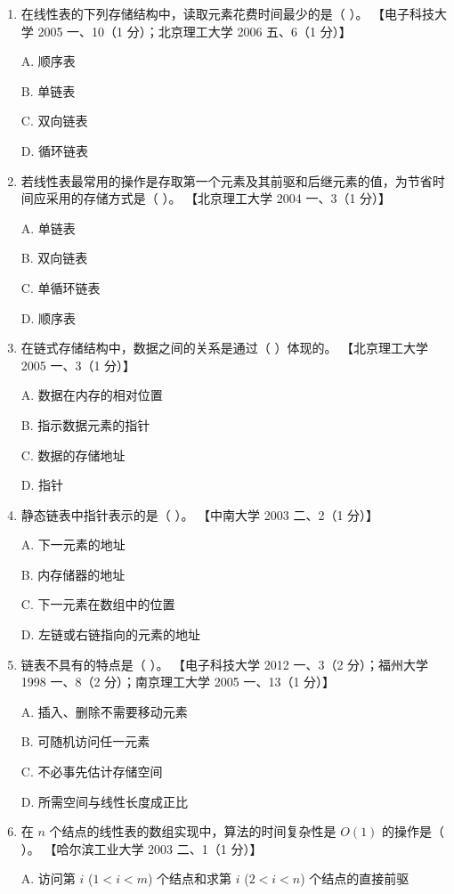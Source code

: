 \documentclass[lang=cn,newtx,10pt,scheme=chinese]{elegantbook}
\begin{document}
\begin{enumerate}
    \item 在线性表的下列存储结构中，读取元素花费时间最少的是（ ）。  
    【电子科技大学 2005 一、10（1 分）；北京理工大学 2006 五、6（1 分）】  

    A. 顺序表  

    B. 单链表  

    C. 双向链表  

    D. 循环链表  

    \item 若线性表最常用的操作是存取第一个元素及其前驱和后继元素的值，为节省时间应采用的存储方式是（ ）。  
    【北京理工大学 2004 一、3（1 分）】  

    A. 单链表  

    B. 双向链表  

    C. 单循环链表  

    D. 顺序表  

    \item 在链式存储结构中，数据之间的关系是通过（ ）体现的。  
    【北京理工大学 2005 一、3（1 分）】  

    A. 数据在内存的相对位置  

    B. 指示数据元素的指针  

    C. 数据的存储地址  

    D. 指针  

    \item 静态链表中指针表示的是（ ）。  
    【中南大学 2003 二、2（1 分）】  

    A. 下一元素的地址  

    B. 内存储器的地址 

    C. 下一元素在数组中的位置  

    D. 左链或右链指向的元素的地址  

    \item 链表不具有的特点是（ ）。  
    【电子科技大学 2012 一、3（2 分）；福州大学 1998 一、8（2 分）；南京理工大学 2005 一、13（1 分）】 

    A. 插入、删除不需要移动元素

    B. 可随机访问任一元素  

    C. 不必事先估计存储空间  

    D. 所需空间与线性长度成正比  

    \item 在 $n$ 个结点的线性表的数组实现中，算法的时间复杂性是 $O(1)$ 的操作是（ ）。  
    【哈尔滨工业大学 2003 二、1（1 分）】  

    A. 访问第 $i$ ($1 < i < m$) 个结点和求第 $i$ ($2 < i < n$) 个结点的直接前驱  


\end{enumerate}
\end{document}
